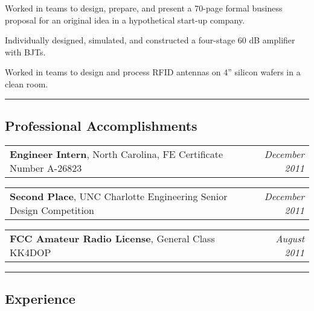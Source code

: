 \documentclass[10pt,letterpaper]{article}
\makeatletter
\newcommand{\headerrow}[2]
{\begin{tabular*}{\linewidth}{l@{\extracolsep{\fill}}r}
	#1 &
	#2 \\
\end{tabular*}}
\makeatother
\begin{document}
\begin{itemize*}
\begin{itemize*}
        \item Worked in teams to design, prepare, and present a 70-page formal business proposal for an original idea in a hypothetical start-up company.
        \item Individually designed, simulated, and constructed a four-stage 60 dB amplifier with BJTs.
        \item Worked in teams to design and process RFID antennas on 4” silicon wafers in a clean room.
    \end{itemize*}
\end{itemize*}

\hrule
\vspace{-0.4em}

\subsection*{Professional Accomplishments}
\headerrow
    {\textbf{Engineer Intern}, North Carolina, FE Certificate Number A-26823}
    {\emph{December 2011}}
\headerrow
    {\textbf{Second Place}, UNC Charlotte Engineering Senior Design Competition}
    {\emph{December 2011}}
\headerrow
    {\textbf{FCC Amateur Radio License}, General Class KK4DOP}
    {\emph{August 2011}}

\hrule
\vspace{-0.4em}
\subsection*{Experience}
\end{document}
